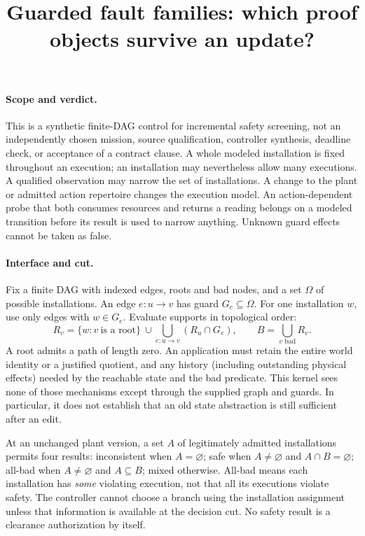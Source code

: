 \documentclass[11pt]{article}
\title{Guarded fault families: which proof objects survive an update?}
\date{}
\begin{document}
\maketitle

\paragraph{Scope and verdict.}
This is a synthetic finite-DAG control for incremental safety screening, not an
independently chosen mission, source qualification, controller synthesis,
deadline check, or acceptance of a contract clause. A whole modeled
installation is fixed throughout an execution; an installation may nevertheless
allow many executions. A qualified observation may narrow the set of
installations. A change to the plant or admitted action repertoire changes the
execution model. An action-dependent probe that both consumes resources and
returns a reading belongs on a modeled transition before its result is used
to narrow anything. Unknown guard effects cannot be taken as false.

\paragraph{Interface and cut.}
Fix a finite DAG with indexed edges, roots and bad nodes, and a set
$\Omega$ of possible installations. An edge $e:u\to v$ has guard
$G_e\subseteq\Omega$. For one installation $w$, use only edges with
$w\in G_e$. Evaluate supports in topological order:
\[
 R_v=\{w:v\ \text{is a root}\}\ \cup
        \bigcup_{e:u\to v}(R_u\cap G_e),\qquad B=\bigcup_{v\text{ bad}}R_v.
\]
A root admits a path of length zero. An application must retain the entire
world identity or a justified quotient, and any history (including outstanding
physical effects) needed by the reachable state and the bad predicate. This
kernel sees none of those mechanisms except through the supplied graph and
guards. In particular, it does not establish that an old state abstraction
is still sufficient after an edit.

At an unchanged plant version, a set $A$ of legitimately admitted
installations permits four results: inconsistent when $A=\varnothing$;
safe when $A\ne\varnothing$ and $A\cap B=\varnothing$; all-bad when
$A\ne\varnothing$ and $A\subseteq B$; mixed otherwise. All-bad means
each installation has \emph{some} violating execution, not that all its
executions violate safety. The controller cannot choose a branch using the
installation assignment unless that information is available at the decision
cut. No safety result is a clearance authorization by itself.
\end{document}
